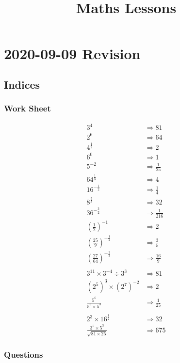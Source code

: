 \documentclass{article}
\begin{document}
\title{Maths Lessons}
\maketitle

\section{2020-09-09 Revision}
\subsection{Indices}
\subsubsection{Work Sheet}
\begin{align*}
	3^4 &\Rightarrow 81 \\
	2^6 &\Rightarrow 64 \\
	4^{\frac{1}{2}} &\Rightarrow 2 \\
	6^0 &\Rightarrow 1 \\
	5^{-2} &\Rightarrow \frac{1}{25} \\
	64^{\frac{1}{3}} &\Rightarrow 4 \\
	16^{-\frac{1}{2}} &\Rightarrow \frac{1}{4} \\
	8^{\frac{5}{3}} &\Rightarrow 32 \\
	36^{-\frac{3}{2}} &\Rightarrow \frac{1}{216} \\
	\left ( \frac{1}{2} \right )^{-1} &\Rightarrow 2 \\
	\left ( \frac{25}{9} \right )^{-\frac{1}{2}} &\Rightarrow \frac{3}{5} \\
	\left ( \frac{27}{64} \right )^{-\frac{2}{3}} &\Rightarrow \frac{16}{9} \\
	\\
	3^11 \times 3^{-4} \div 3^3 &\Rightarrow 81 \\
	\left ( 2^5 \right )^3 \times \left ( 2^7 \right )^{-2} &\Rightarrow 2 \\
	\frac{5^6}{5^5 \times 5^3} &\Rightarrow \frac{1}{25} \\
	\\
	2^3 \times 16^{\frac{1}{2}} &\Rightarrow 32 \\
	\frac{3^5 \times 5^3}{\sqrt{81 \times 25}} &\Rightarrow 675
\end{align*}

\subsubsection{Questions}
\end{document}
